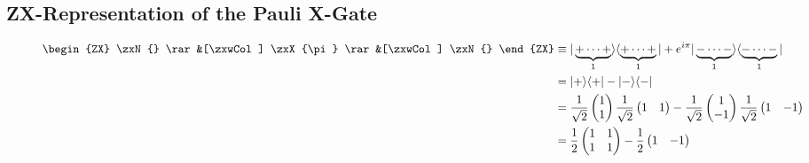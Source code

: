 \subsection{ZX-Representation of the Pauli X-Gate}
\label{appendix:pauli-x-gate-as-spider}


\begin{figure}[h]
    \begin{align*}
        \begin{ZX}
            \zxN{} \rar &[\zxwCol] \zxX{\pi} \rar &[\zxwCol] \zxN{}
        \end{ZX}
         & \equiv |\underbrace{+\dots +}_{1}\rangle \langle \underbrace{+\dots +}_{1}| + e^{i\pi}|\underbrace{-\dots -}_{1}\rangle \langle \underbrace{-\dots -}_{1}| \\
         & =
        |+\rangle \langle +| - |-\rangle \langle -|                                                                                                                   \\
         & =
        \frac{1}{\sqrt{2}}
        \begin{pmatrix}
            1 \\
            1 \\
        \end{pmatrix}
        \frac{1}{\sqrt{2}}
        \begin{pmatrix}
            1 & 1 \\
        \end{pmatrix}
        -
        \frac{1}{\sqrt{2}}
        \begin{pmatrix}
            1  \\
            -1 \\
        \end{pmatrix}
        \frac{1}{\sqrt{2}}
        \begin{pmatrix}
            1 & -1 \\
        \end{pmatrix}                                                                                                                                                \\
         & =
        \frac{1}{2}
        \begin{pmatrix}
            1 & 1 \\
            1 & 1 \\
        \end{pmatrix}
        -
        \frac{1}{2}
        \begin{pmatrix}
            1  & -1 \\

\end{pmatrix}
\end{align*}
\end{figure}
